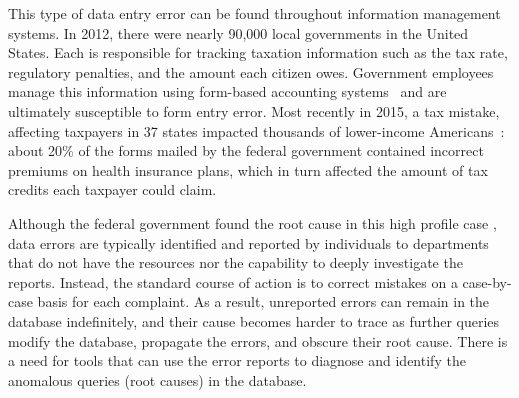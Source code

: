 

This type of data entry error can be found throughout information
management systems. In 2012, there were nearly 90,000 local
governments in the United States. Each is responsible for tracking
taxation information such as the tax rate, regulatory penalties, and
the amount each citizen owes. Government employees manage this
information using form-based accounting
systems~\cite{reutersmanagement} and are ultimately susceptible to
form entry error. Most recently in 2015, a tax mistake, affecting
taxpayers in 37 states impacted thousands of lower-income
Americans~\cite{nyt-tax-article}: about 20\% of the forms mailed by the federal government contained incorrect premiums on health insurance plans, which in turn affected the amount of tax credits each taxpayer could claim.  

Although the federal government found the root cause in this high
profile case , data errors are typically identified and reported by
individuals to departments that do not have the resources nor the
capability to deeply investigate the reports. Instead, the standard
course of action is to correct mistakes on a case-by-case basis for
each complaint. As a result, unreported errors can remain in the
database indefinitely, and their cause becomes harder to trace as
further queries modify the database, propagate the errors, and obscure
their root cause. There is a need for tools that can use the error
reports to diagnose and identify the anomalous queries (root causes)
in the database.


